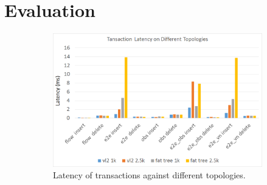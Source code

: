 \section{Evaluation}
\label{sec:eval}

% 

\begin{figure}[ht!]
        \centering
        \begin{subfigure}[b]{.4\linewidth}
          \centering
          \includegraphics[width=1\textwidth]{transaction_latency.png}
  \caption{Latency of transactions against different topologies.}
  \label{fig:latency-all}
        \end{subfigure}
        \hfill
        \begin{subfigure}[b]{.232\linewidth}
  \centering

\end{subfigure}
\end{figure}

